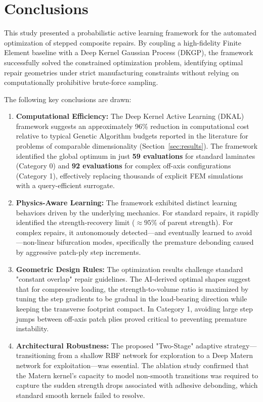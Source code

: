 \documentclass[
  preprint,
  12pt,
  a4paper
]{elsarticle}
\newcommand{\new}[1]{#1}
\begin{document}
\section{Conclusions}
\label{sec:conclusion}

This study presented a probabilistic active learning framework for the automated optimization of stepped composite repairs. By coupling a high-fidelity Finite Element baseline with a Deep Kernel Gaussian Process (DKGP), the framework successfully \new{solved the constrained optimization problem}, identifying optimal repair geometries under strict manufacturing constraints without relying on computationally prohibitive brute-force sampling.

The following key conclusions are drawn:
\begin{enumerate}
    \item \textbf{Computational Efficiency:} The \new{Deep Kernel Active Learning (DKAL) framework suggests an approximately 96\% reduction in computational cost relative to typical Genetic Algorithm budgets reported in the literature for problems of comparable dimensionality (Section~\ref{sec:results})}. The framework identified the global optimum in just \textbf{59 evaluations} for standard laminates (Category 0) and \textbf{92 evaluations} for complex off-axis configurations (Category 1), effectively replacing thousands of explicit FEM simulations with a query-efficient surrogate.
    
    \item \textbf{Physics-Aware Learning:} The \new{framework} exhibited distinct learning behaviors driven by the underlying mechanics. For standard repairs, it rapidly identified the \new{strength-recovery limit} ($\approx 95\%$ of parent strength). For complex repairs, it autonomously detected—and eventually learned to avoid—non-linear bifurcation modes, specifically the premature debonding caused by aggressive \new{patch-ply} step increments.
    
    \item \textbf{Geometric Design Rules:} The optimization results challenge standard "constant overlap" repair guidelines. The AI-derived optimal shapes suggest that for compressive loading, \new{the strength-to-volume ratio} is maximized by tuning the step gradients to be gradual in the load-bearing direction while keeping the transverse footprint compact. In Category 1, avoiding large step jumps between off-axis \new{patch plies} proved critical to preventing premature instability.
    
    \item \textbf{Architectural Robustness:} The proposed "Two-Stage" adaptive strategy—transitioning from a shallow RBF network for exploration to a Deep Matern network for exploitation—was essential. The ablation study confirmed that the Matern kernel's capacity to model non-smooth transitions was required to capture the sudden strength drops associated with adhesive debonding, which standard smooth kernels failed to resolve.
\end{enumerate}
\end{document}
